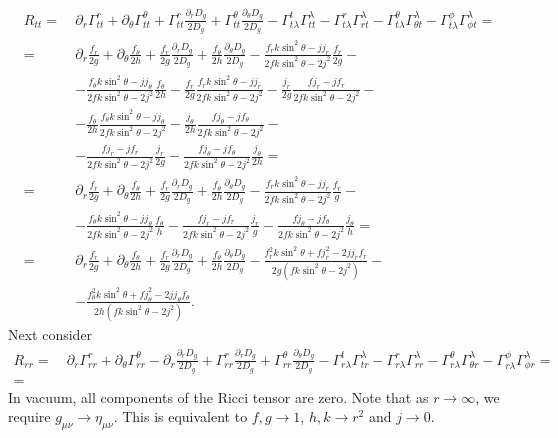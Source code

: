 \documentclass[english, parskip=full]{scrartcl}
\begin{document}
\begin{align*}
R_{tt} =\ &\partial_r\Gamma^r_{tt} + \partial_\theta\Gamma^\theta_{tt}  + \Gamma^r_{tt} \frac{\partial_r D_g}{2D_g} + \Gamma^\theta_{tt} \frac{\partial_\theta D_g}{2D_g} - \Gamma^t_{t\lambda} \Gamma^\lambda_{t t} - \Gamma^r_{t\lambda} \Gamma^\lambda_{r t} - \Gamma^\theta_{t\lambda} \Gamma^\lambda_{\theta t} - \Gamma^\phi_{t\lambda} \Gamma^\lambda_{\phi t} = \\
=\ &\partial_r \frac{f_r}{2g} + \partial_\theta \frac{f_\theta}{2h} + \frac{f_r}{2g} \frac{\partial_rD_g}{2D_g} + \frac{f_\theta}{2h} \frac{\partial_\theta D_g}{2D_g} - \frac{f_rk\sin^2\theta - jj_r}{2fk\sin^2\theta - 2j^2} \frac{f_r}{2g} - \\
&-\frac{f_\theta k\sin^2\theta - jj_\theta}{2fk\sin^2\theta - 2j^2} \frac{f_\theta}{2h} - \frac{f_r}{2g} \frac{f_rk\sin^2\theta - jj_r}{2fk\sin^2\theta - 2j^2} - \frac{j_r}{2g} \frac{fj_r-jf_r}{2fk\sin^2\theta - 2j^2} - \\
&- \frac{f_\theta}{2h} \frac{f_\theta k\sin^2\theta - jj_\theta}{2fk\sin^2\theta - 2j^2} - \frac{j_\theta}{2h} \frac{fj_\theta - jf_\theta}{2fk\sin^2\theta - 2j^2} - \\
&- \frac{fj_r - jf_r}{2fk\sin^2\theta - 2j^2} \frac{j_r}{2g} - \frac{fj_\theta - jf_\theta}{2fk\sin^2\theta - 2j^2} \frac{j_\theta}{2h} = \\
= \ &\partial_r \frac{f_r}{2g} + \partial_\theta \frac{f_\theta}{2h} + \frac{f_r}{2g} \frac{\partial_rD_g}{2D_g} + \frac{f_\theta}{2h} \frac{\partial_\theta D_g}{2D_g} - \frac{f_rk\sin^2\theta - jj_r}{2fk\sin^2\theta - 2j^2} \frac{f_r}{g} - \\
&-\frac{f_\theta k\sin^2\theta - jj_\theta}{2fk\sin^2\theta - 2j^2} \frac{f_\theta}{h} - \frac{fj_r - jf_r}{2fk\sin^2\theta - 2j^2} \frac{j_r}{g} - \frac{fj_\theta - jf_\theta}{2fk\sin^2\theta - 2j^2} \frac{j_\theta}{h} = \\
= \ &\partial_r \frac{f_r}{2g} + \partial_\theta \frac{f_\theta}{2h} + \frac{f_r}{2g} \frac{\partial_rD_g}{2D_g} + \frac{f_\theta}{2h} \frac{\partial_\theta D_g}{2D_g} - \frac{f_r^2k\sin^2\theta + fj_r^2 - 2jj_rf_r}{2g(fk\sin^2\theta - 2j^2)}  - \\
&-\frac{f_\theta^2 k\sin^2\theta + fj_\theta^2 - 2jj_\theta f_\theta}{2h(fk\sin^2\theta - 2j^2)}.
\end{align*}
Next consider
\begin{align*}
R_{rr} =\ &\partial_r\Gamma^r_{rr} + \partial_\theta\Gamma^\theta_{rr} - \partial_r \frac{\partial_r D_g}{2D_g} + \Gamma^r_{rr} \frac{\partial_r D_g}{2D_g} + \Gamma^\theta_{rr} \frac{\partial_\theta D_g}{2D_g} - \Gamma^t_{r\lambda} \Gamma^\lambda_{t r} - \Gamma^r_{r\lambda} \Gamma^\lambda_{r r} - \Gamma^\theta_{r\lambda} \Gamma^\lambda_{\theta r} - \Gamma^\phi_{r\lambda} \Gamma^\lambda_{\phi r} = \\
=\ &
\end{align*}
In vacuum, all components of the Ricci tensor are zero.
Note that as $r\rightarrow\infty$, we require $g_{\mu\nu} \rightarrow \eta_{\mu\nu}$.
This is equivalent to $f,g \rightarrow 1$, $h,k \rightarrow r^2$ and $j\rightarrow 0$.



\end{document}
